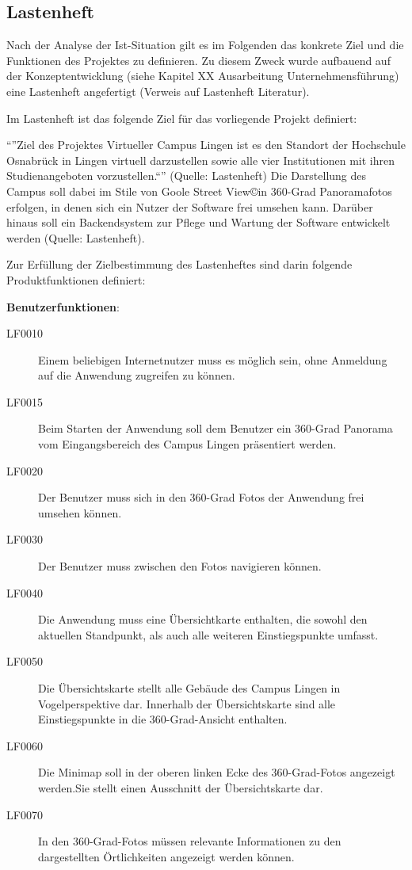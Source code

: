 \subsection{Lastenheft}
\label{sec:Lastenheft}

Nach der Analyse der Ist-Situation gilt es im Folgenden das konkrete Ziel und die Funktionen des Projektes zu definieren. 
Zu diesem Zweck wurde aufbauend auf der Konzeptentwicklung (siehe Kapitel XX Ausarbeitung Unternehmensführung) eine 
Lastenheft angefertigt (Verweis auf Lastenheft Literatur).

Im Lastenheft ist das folgende Ziel für das vorliegende Projekt definiert:

"`"'Ziel des Projektes Virtueller Campus Lingen ist es den Standort der Hochschule Osnabrück
in Lingen virtuell darzustellen sowie alle vier Institutionen mit ihren Studienangeboten
vorzustellen."`"' (Quelle: Lastenheft)
Die Darstellung des Campus soll dabei im Stile von Goole Street View\copyright in 360-Grad Panoramafotos erfolgen, in 
denen sich ein Nutzer der Software frei umsehen kann. Darüber hinaus soll ein Backendsystem zur Pflege und Wartung der 
Software entwickelt werden (Quelle: Lastenheft).

Zur Erfüllung der Zielbestimmung des Lastenheftes sind darin folgende Produktfunktionen definiert:

\textbf{Benutzerfunktionen}:

\begin{description}
  \item[LF0010] Einem beliebigen Internetnutzer muss es möglich sein, ohne Anmeldung auf die Anwendung zugreifen zu können.
  \item[LF0015] Beim Starten der Anwendung soll dem Benutzer ein 360-Grad Panorama vom Eingangsbereich des Campus Lingen 
  präsentiert werden.
  \item[LF0020] Der Benutzer muss sich in den 360-Grad Fotos der Anwendung frei umsehen können.
  \item[LF0030] Der Benutzer muss zwischen den Fotos navigieren können.
  \item[LF0040] Die Anwendung muss eine Übersichtkarte enthalten, die sowohl den aktuellen Standpunkt, als auch alle 
  weiteren Einstiegspunkte umfasst.
  \item[LF0050] Die Übersichtskarte stellt alle Gebäude des Campus Lingen in Vogelperspektive dar. Innerhalb der 
  Übersichtskarte sind alle Einstiegspunkte in die 360-Grad-Ansicht enthalten.
  \item[LF0060] Die Minimap soll in der oberen linken Ecke des 360-Grad-Fotos angezeigt werden.Sie stellt einen Ausschnitt 
  der Übersichtskarte dar.
  \item[LF0070] In den 360-Grad-Fotos müssen relevante Informationen zu den dargestellten Örtlichkeiten angezeigt werden können.
\end{description}

